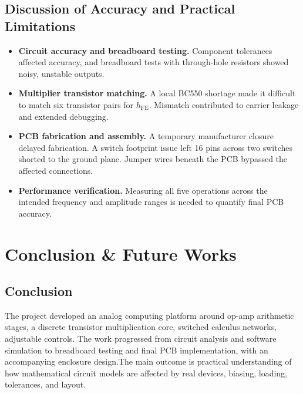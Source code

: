 \documentclass[11pt,a4paper]{article}
\begin{document}
\subsection{Discussion of Accuracy and Practical Limitations}

\begin{itemize}
    \item \textbf{Circuit accuracy and breadboard testing.} Component tolerances affected accuracy, and breadboard tests with through-hole resistors showed noisy, unstable outputs.

    \item \textbf{Multiplier transistor matching.} A local BC550 shortage made it difficult to match six transistor pairs for $h_{\mathrm{FE}}$. Mismatch contributed to carrier leakage and extended debugging.

    \item \textbf{PCB fabrication and assembly.} A temporary manufacturer closure delayed fabrication. A switch footprint issue left 16 pins across two switches shorted to the ground plane. Jumper wires beneath the PCB bypassed the affected connections.

    \item \textbf{Performance verification.} Measuring all five operations across the intended frequency and amplitude ranges is needed to quantify final PCB accuracy.
\end{itemize}

\section{Conclusion \& Future Works}
\subsection{Conclusion}
The project developed an analog computing platform around op-amp arithmetic stages, a discrete transistor multiplication core, switched calculus networks, adjustable controls. The work progressed from circuit analysis and software simulation to breadboard testing and final PCB implementation, with an accompanying enclosure design.The main outcome is practical understanding of how mathematical circuit models are affected by real devices, biasing, loading, tolerances, and layout.
\end{document}
